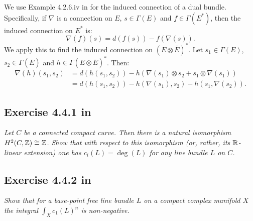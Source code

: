 \documentclass{article}
\begin{document}
We use Example 4.2.6.iv in \cite{Huy} for the induced connection of a dual bundle. Specifically, if $\nabla$ is
a connection on $E$, $s\in \Gamma(E)$ and $f\in \Gamma(E^*)$, then the induced connection on $E^*$ is:
\[	\nabla(f)(s) = d(f(s)) - f(\nabla(s)).	\]
We apply this to find the induced connection on $(E\otimes \bar E)^*$. Let $s_1 \in \Gamma(E)$, $s_2 \in \Gamma(\bar E)$
and $h\in \Gamma(E\otimes \bar E)^*$. Then:
\begin{align*}
	\nabla(h)(s_1, s_2) &= d(h(s_1,s_2)) - h(\nabla(s_1)\otimes s_2 + s_1 \otimes \nabla(s_1)) \\
&= d(h(s_1,s_2)) - h(\nabla(s_1),s_2) - h(s_1, \nabla(s_2)).
\end{align*}



\subsection*{Exercise 4.4.1 in \cite{Huy}}
\emph{Let $C$ be a connected compact curve. Then there is a natural isomorphism
$H^2(C,\mathbb{Z}) \cong \mathbb{Z}$. Show that with respect to this isomorphism (or, rather, its $\mathbb{R}$-linear
extension) one has $c_i(L) = \deg(L)$ for any line bundle $L$ on $C$.}
\vspace{3mm}



\subsection*{Exercise 4.4.2 in \cite{Huy}}
\emph{Show that for a base-point free line bundle $L$ on a compact complex manifold
$X$ the integral $\int_X c_1(L)^n$ is non-negative.}
\vspace{3mm}
\end{document}
